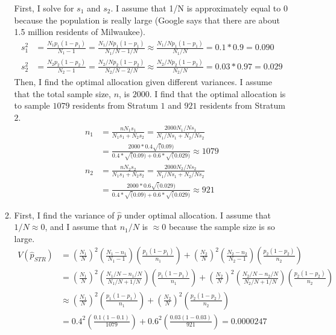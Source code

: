 \documentclass[12pt]{article}\usepackage[]{graphicx}\usepackage[]{color}
\begin{document}
\begin{doublespacing}
\begin{enumerate}
\begin{enumerate}
First, I solve for $s_1$ and $s_2$. I assume that 1/N is approximately equal to $0$ because the population is really large (Google says that there are about 1.5 million residents of Milwaukee). 
\begin{align*}
s_1^2 &= \frac{N_1p_1(1-p_1)}{N_1-1} = \frac{N_1/N p_1(1-p_1)}{N_1/N-1/N} \approx \frac{N_1/N p_1(1-p_1)}{N_1/N} = 0.1*0.9 = 0.090 \\
s_2^2 &= \frac{N_2p_2(1-p_2)}{N_2-1} = \frac{N_2/N p_2(1-p_2)}{N_2/N-2/N} \approx \frac{N_2/N p_2(1-p_2)}{N_2/N} = 0.03*0.97 = 0.029
\end{align*}
Then, I find the optimal allocation given different variances. I assume that the total sample size, $n$, is $2000$. I find that the optimal allocation is to sample $1079$ residents from Stratum $1$ and $921$ residents from Stratum $2$.
\begin{align*}
n_1 &= \frac{nN_1s_1}{N_1s_1+N_2s_2} = \frac{2000N_1/Ns_1}{N_1/Ns_1+N_2/Ns_2} \\
&= \frac{2000*0.4\sqrt(0.09)}{0.4*\sqrt(0.09)+0.6*\sqrt(0.029)} \approx 1079 \\
n_2 &= \frac{nN_2s_2}{N_1s_1+N_2s_2} = \frac{2000N_2/Ns_2}{N_1/Ns_1+N_2/Ns_2} \\
&= \frac{2000*0.6\sqrt(0.029)}{0.4*\sqrt(0.09)+0.6*\sqrt(0.029)} \approx 921 
\end{align*}




\item First, I find the variance of $\hat{p}$ under optimal allocation. I assume that $1/N \approx 0$, and I assume that $n_1/N$ is $\approx 0$ because the sample size is so large.
\begin{align*}
V(\hat{p}_{STR}) &= \left(\frac{N_1}{N}\right)^2 \left(\frac{N_1-n_1}{N_1-1}\right) \left(\frac{p_1(1-p_1)}{n_1}\right)+\left(\frac{N_2}{N}\right)^2 \left(\frac{N_2-n_2}{N_2-1}\right) \left(\frac{p_2(1-p_2)}{n_2}\right) \\
&= \left(\frac{N_1}{N}\right)^2 \left(\frac{N_1/N-n_1/N}{N_1/N+1/N}\right) \left(\frac{p_1(1-p_1)}{n_1}\right)+\left(\frac{N_2}{N}\right)^2 \left(\frac{N_2/N-n_2/N}{N_2/N+1/N}\right) \left(\frac{p_2(1-p_2)}{n_2}\right) \\
&\approx \left(\frac{N_1}{N}\right)^2 \left(\frac{p_1(1-p_1)}{n_1}\right)+\left(\frac{N_2}{N}\right)^2 \left(\frac{p_2(1-p_2)}{n_2}\right) \\
&= 0.4^2 \left(\frac{0.1(1-0.1)}{1079}\right)+0.6^2 \left(\frac{0.03(1-0.03)}{921}\right) = 0.0000247
\end{align*}





\end{enumerate}
\end{enumerate}
\end{doublespacing}
\end{document}
